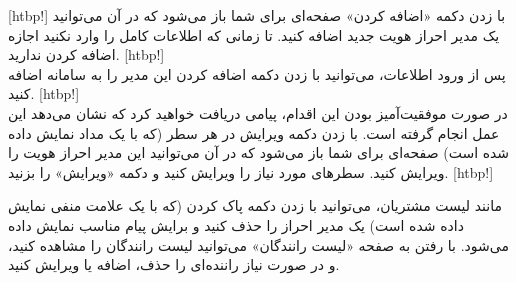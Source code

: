 	[htbp!]
\newpage
		 با زدن دکمه «اضافه کردن» صفحه‌ای برای شما باز می‌شود که در آن می‌توانید یک مدیر احراز هویت جدید اضافه کنید. تا زمانی که اطلاعات کامل را وارد نکنید اجازه اضافه کردن ندارید.
[htbp!]
\\
پس از ورود اطلاعات، می‌توانید با زدن دکمه اضافه کردن این مدیر را به سامانه اضافه کنید.
[htbp!]
\\
در صورت موفقیت‌آمیز بودن این اقدام، پیامی دریافت خواهید کرد که نشان می‌دهد این عمل انجام گرفته است.
 با زدن دکمه ویرایش در هر سطر (که با یک مداد نمایش داده شده است) صفحه‌ای برای شما باز می‌شود که در آن می‌توانید این مدیر احراز هویت را ویرایش کنید. سطرهای مورد نیاز را ویرایش کنید و دکمه «ویرایش» را بزنید.
[htbp!]

	 مانند لیست مشتریان، می‌توانید با زدن دکمه پاک کردن (که با یک علامت منفی نمایش داده شده است) یک مدیر احراز را حذف کنید و برایش پیام مناسب نمایش داده می‌شود.
	 با رفتن به صفحه «لیست رانندگان» می‌توانید لیست رانندگان را مشاهده کنید، و در صورت نیاز راننده‌ای را حذف، اضافه یا ویرایش کنید.


